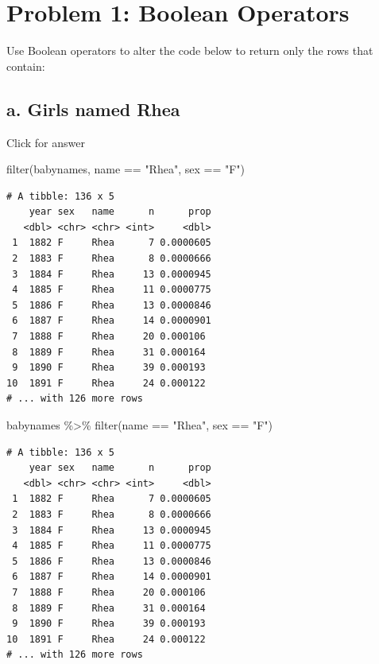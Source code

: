 \documentclass[
]{book}
\newenvironment{Shaded}{\begin{snugshade}}{\end{snugshade}}
\newcommand{\FunctionTok}[1]{\textcolor[rgb]{0.00,0.00,0.00}{#1}}
\newcommand{\NormalTok}[1]{#1}
\newcommand{\SpecialCharTok}[1]{\textcolor[rgb]{0.00,0.00,0.00}{#1}}
\newcommand{\StringTok}[1]{\textcolor[rgb]{0.31,0.60,0.02}{#1}}
\begin{document}
\hypertarget{problem-1-boolean-operators}{%
\section{Problem 1: Boolean Operators}\label{problem-1-boolean-operators}}

Use Boolean operators to alter the code below to return only the rows that contain:

\hypertarget{a.-girls-named-rhea}{%
\subsection{a. Girls named Rhea}\label{a.-girls-named-rhea}}

Click for answer

\begin{Shaded}
\begin{Highlighting}[]
\FunctionTok{filter}\NormalTok{(babynames, name }\SpecialCharTok{==} \StringTok{"Rhea"}\NormalTok{, sex }\SpecialCharTok{==} \StringTok{"F"}\NormalTok{)}
\end{Highlighting}
\end{Shaded}

\begin{verbatim}
# A tibble: 136 x 5
    year sex   name      n      prop
   <dbl> <chr> <chr> <int>     <dbl>
 1  1882 F     Rhea      7 0.0000605
 2  1883 F     Rhea      8 0.0000666
 3  1884 F     Rhea     13 0.0000945
 4  1885 F     Rhea     11 0.0000775
 5  1886 F     Rhea     13 0.0000846
 6  1887 F     Rhea     14 0.0000901
 7  1888 F     Rhea     20 0.000106 
 8  1889 F     Rhea     31 0.000164 
 9  1890 F     Rhea     39 0.000193 
10  1891 F     Rhea     24 0.000122 
# ... with 126 more rows
\end{verbatim}

\begin{Shaded}
\begin{Highlighting}[]
\NormalTok{babynames }\SpecialCharTok{\%\textgreater{}\%}  \FunctionTok{filter}\NormalTok{(name }\SpecialCharTok{==} \StringTok{"Rhea"}\NormalTok{, sex }\SpecialCharTok{==} \StringTok{"F"}\NormalTok{)}
\end{Highlighting}
\end{Shaded}

\begin{verbatim}
# A tibble: 136 x 5
    year sex   name      n      prop
   <dbl> <chr> <chr> <int>     <dbl>
 1  1882 F     Rhea      7 0.0000605
 2  1883 F     Rhea      8 0.0000666
 3  1884 F     Rhea     13 0.0000945
 4  1885 F     Rhea     11 0.0000775
 5  1886 F     Rhea     13 0.0000846
 6  1887 F     Rhea     14 0.0000901
 7  1888 F     Rhea     20 0.000106 
 8  1889 F     Rhea     31 0.000164 
 9  1890 F     Rhea     39 0.000193 
10  1891 F     Rhea     24 0.000122 
# ... with 126 more rows
\end{verbatim}
\end{document}
